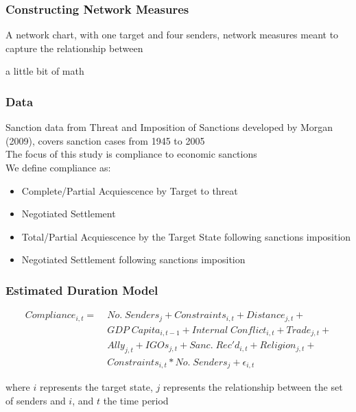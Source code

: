 \documentclass{beamer}
\begin{document}
\begin{frame}
\frametitle{Constructing Network Measures}

A network chart, with one target and four senders, network measures meant to capture the relationship between

a little bit of math

\end{frame}

\begin{frame}
\frametitle{Data}

Sanction data from Threat and Imposition of Sanctions developed by Morgan (2009), covers sanction cases from 1945 to 2005 \\
\vspace{0.5cm}
The focus of this study is compliance to economic sanctions \\
\vspace{0.5cm}
We define compliance as:

\begin{itemize}
	\item Complete/Partial Acquiescence by Target to threat
	\item Negotiated Settlement
	\item Total/Partial Acquiescence by the Target State following sanctions imposition
	\item Negotiated Settlement following sanctions imposition
\end{itemize}

\end{frame}

\begin{frame}
\frametitle{Estimated Duration Model}

\begin{align*}
Compliance_{i,t} =\; & No. \; Senders_{j} + Constraints_{i,t} + Distance_{j,t} + \\
 &GDP \; Capita_{i,t-1} +  Internal \; Conflict_{i,t} + Trade_{j,t} + \\
 &Ally_{j,t} + IGOs_{j,t} + Sanc. \; Rec'd_{i,t} + Religion_{j,t} + \\
 &Constraints_{i,t}*No. \; Senders_{j} + \epsilon_{i,t}
\end{align*}

where $i$ represents the target state, $j$ represents the relationship between the set of senders and $i$, and $t$ the time period

\end{frame}
\end{document}
